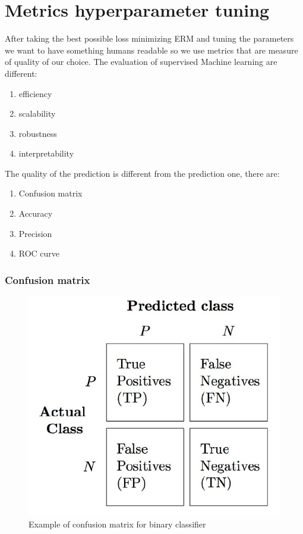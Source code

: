 \chapter{Metrics hyperparameter tuning}

After taking the best possible loss minimizing ERM and tuning the parameters we want to have something humans readable so we use metrics that are measure of quality of our choice.
The evaluation of supervised Machine learning are different:
\begin{enumerate}
    \item efficiency
    \item scalability
    \item robustness
    \item interpretability
\end{enumerate}

The quality of the prediction is different from the prediction one, there are:
\begin{enumerate}
    \item Confusion matrix
    \item Accuracy 
    \item Precision 
    \item ROC curve
\end{enumerate}
\subsection{Confusion matrix}
\begin{figure}[H]
    \centering
    \includegraphics[scale=0.3]{images/PM/PM1.png}
    \caption{Example of confusion matrix for binary classifier}
    \label{fig:enter-label}
\end{figure}

